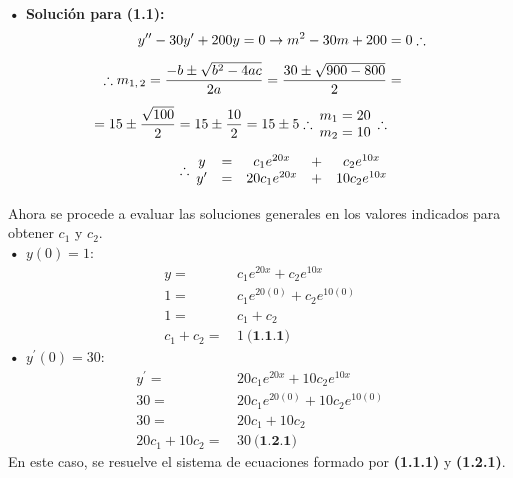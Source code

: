 \documentclass[letterpaper, 12pt]{article}
\begin{document}
{\large \textbf{• Solución para (1.1):}
\begin{equation*}
    \begin{aligned}
        y^{\prime\prime}-30y^{\prime}+200y=0\rightarrow m^2-30m+200&=0\therefore\\[5pt]
        \therefore m_{1,\,2}={-b\pm\sqrt{b^2-4ac}\over 2a}={30\pm\sqrt{900-800}\over 2}&=\\[5pt]
        =15\pm {\sqrt{100}\over 2}=15\pm {10 \over 2}=15\pm 5
        \therefore\: \begin{matrix}
            m_1=20\\
            m_2=10
        \end{matrix}\: \therefore\\[5pt]
        \therefore\: \begin{matrix}
            y&=&c_1e^{20x}&+&c_2e^{10x}\\
            y^{\prime}&=&20c_1e^{20x}&+&10c_2e^{10x}
        \end{matrix}\\[5pt]
    \end{aligned}
\end{equation*}
Ahora se procede a evaluar las soluciones generales en los valores indicados para obtener \(c_1\) y \(c_2\).\\\newline
\textbf{  • \(y(0)=1:\)}\\
\begin{equation*}
    \begin{aligned}
        y=&\, c_1e^{20x}+c_2e^{10x}\\[5pt]
        1=&\, c_1e^{20(0)}+c_2e^{10(0)}\\[5pt]
        1=&\, c_1+c_2\\[5pt]
        c_1+c_2=&\, 1\: \textbf{(1.1.1)}
    \end{aligned}
\end{equation*}
\textbf{• \(y^{\prime}(0)=30:\)}\\
\begin{equation*}
    \begin{aligned}
        y^{\prime}=&\, 20c_1e^{20x}+10c_2e^{10x}\\[5pt]
        30=&\, 20c_1e^{20(0)}+10c_2e^{10(0)}\\[5pt]
        30=&\, 20c_1+10c_2\\[5pt]
        20c_1+10c_2=&\, 30\: \textbf{(1.2.1)}      
    \end{aligned}
\end{equation*}
En este caso, se resuelve el sistema de ecuaciones formado por \textbf{(1.1.1)} y \textbf{(1.2.1)}.\\
}
\end{document}
